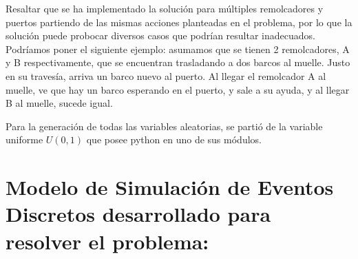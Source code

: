 \documentclass[titlepage,11pt]{scrartcl}
\begin{document}
	Resaltar que se ha implementado la solución para múltiples remolcadores y puertos partiendo de las mismas acciones planteadas en el problema, por lo que la solución puede probocar diversos casos que podrían resultar inadecuados. Podríamos poner el siguiente ejemplo: asumamos que se tienen 2 remolcadores, A y B respectivamente, que se encuentran trasladando a dos barcos al muelle. Justo en su travesía, arriva un barco nuevo al puerto. Al llegar el remolcador A al muelle, ve que hay un barco esperando en el puerto, y sale a su ayuda, y al llegar B al muelle, sucede igual.

	Para la generación de todas las variables aleatorias, se partió de la variable uniforme $U(0, 1)$ que posee python en uno de sus módulos.


\section{Modelo de Simulación de Eventos Discretos desarrollado para resolver el problema:}
\end{document}

